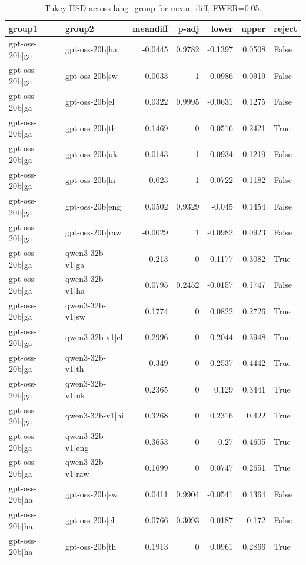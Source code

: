 \begin{table}
\caption{Tukey HSD across lang_group for mean_diff, FWER=0.05.}
\label{tab:tukey_lang_group_low_2021_mean_diff}
\begin{tabular}{l l r r r r l}
\toprule
group1 & group2 & meandiff & p-adj & lower & upper & reject \\
\midrule
gpt-oss-20b|ga & gpt-oss-20b|ha & -0.0445 & 0.9782 & -0.1397 & 0.0508 & False \\
gpt-oss-20b|ga & gpt-oss-20b|sw & -0.0033 & 1 & -0.0986 & 0.0919 & False \\
gpt-oss-20b|ga & gpt-oss-20b|el & 0.0322 & 0.9995 & -0.0631 & 0.1275 & False \\
gpt-oss-20b|ga & gpt-oss-20b|th & 0.1469 & 0 & 0.0516 & 0.2421 & True \\
gpt-oss-20b|ga & gpt-oss-20b|uk & 0.0143 & 1 & -0.0934 & 0.1219 & False \\
gpt-oss-20b|ga & gpt-oss-20b|hi & 0.023 & 1 & -0.0722 & 0.1182 & False \\
gpt-oss-20b|ga & gpt-oss-20b|eng & 0.0502 & 0.9329 & -0.045 & 0.1454 & False \\
gpt-oss-20b|ga & gpt-oss-20b|raw & -0.0029 & 1 & -0.0982 & 0.0923 & False \\
gpt-oss-20b|ga & qwen3-32b-v1|ga & 0.213 & 0 & 0.1177 & 0.3082 & True \\
gpt-oss-20b|ga & qwen3-32b-v1|ha & 0.0795 & 0.2452 & -0.0157 & 0.1747 & False \\
gpt-oss-20b|ga & qwen3-32b-v1|sw & 0.1774 & 0 & 0.0822 & 0.2726 & True \\
gpt-oss-20b|ga & qwen3-32b-v1|el & 0.2996 & 0 & 0.2044 & 0.3948 & True \\
gpt-oss-20b|ga & qwen3-32b-v1|th & 0.349 & 0 & 0.2537 & 0.4442 & True \\
gpt-oss-20b|ga & qwen3-32b-v1|uk & 0.2365 & 0 & 0.129 & 0.3441 & True \\
gpt-oss-20b|ga & qwen3-32b-v1|hi & 0.3268 & 0 & 0.2316 & 0.422 & True \\
gpt-oss-20b|ga & qwen3-32b-v1|eng & 0.3653 & 0 & 0.27 & 0.4605 & True \\
gpt-oss-20b|ga & qwen3-32b-v1|raw & 0.1699 & 0 & 0.0747 & 0.2651 & True \\
gpt-oss-20b|ha & gpt-oss-20b|sw & 0.0411 & 0.9904 & -0.0541 & 0.1364 & False \\
gpt-oss-20b|ha & gpt-oss-20b|el & 0.0766 & 0.3093 & -0.0187 & 0.172 & False \\
gpt-oss-20b|ha & gpt-oss-20b|th & 0.1913 & 0 & 0.0961 & 0.2866 & True \\

\end{tabular}
\end{table}
